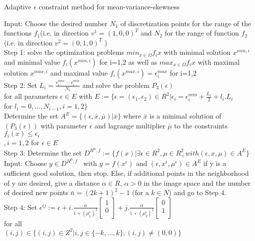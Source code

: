 \documentclass[12pt,a4paper]{article}
\numberwithin{equation}{section}
\begin{document}
\begin{algorithm}[H]
\caption{Adaptive $\epsilon$ constraint method for mean-variance-skewness }
\label{alg:algorithm-label}
Input: Choose the desired number $N_1$ of discretization points
       for the range of the functions $f_1$(i.e. in direction $v^1=(1,0,0)^T$ and $N_2$ for the range of function $f_2$ (i.e. in direction  $v^2=(0,1,0)^T$ )  \\
       Step 1: solve the optimization problems $min_{x \in \Omega} f_{i}x$
       with minimal solution $x^{min,i}$ and minimal value $f_i(x^{min,i})$
       for i=1,2 as well as $max_{x \in \Omega} f_{i}x$ with maximal solution $x^{max,i}$ and maximal value $f_{i}(x^{max,i})=\epsilon_{i}^{max}$ for i=1,2  \\
       Step 2: Set  $L_i=\frac{\epsilon_{i}^{max}-\epsilon_{i}^{min}}{N_i}$
       and solve the problem $P_3(\epsilon)$ \\
       for all parameters $\epsilon \in E$ with 
       $E:=\{ \epsilon=(\epsilon_1,\epsilon_2)\in R^2 | \epsilon_i=\epsilon_{i}^{min}+\frac{L_{i}}{2}+l_i.L_i$  \\
       for $l_i=0,...,N_{i-1} , i=1,2  \}$  \\
       Determine the set 
       $A^{E}=\{ (\epsilon,\bar{x},\bar{\mu}) | \bar{x} \} $ where $\bar{x}$ is a minimal solution of 
       $(P_{3}(\epsilon))$ with parameter $\epsilon$  and lagrange multiplier  $\bar{\mu}$  
        to the constraints $f_i(x) \leq  \epsilon_{i}$ \\
        $,i=1,2$  for $\epsilon \in E   $ \\
        Step 3: Determine the set
        $D^{H^0,f}:=\{f(x)|\exists \epsilon \in R^{2}, \mu \in R^{2}_{+} with (\epsilon,x,\mu)\in A^{E} \} $  \\
        Input: Choose $y\in D^{H^{0},f}$ \ with $y=f(x^{\epsilon})$ and $(\epsilon ,x^{\epsilon},\mu^{\epsilon}) \in A^{E}$
        if y is a sufficient good solution, then stop. Else, if additional points in the neighborhood of y are desired, give a distance $\alpha \in R$, $\alpha>0$ in the image space and the number of desired new points $\bar{n}=(2k+1)^2-1$ (for a $k \in N$) and go to Step 4. \\
        Step 4: Set 
        $\epsilon^{ij}:=\epsilon+i.\frac{\alpha}{1+(\mu_{1}^{\epsilon})^{2}}  \begin{bmatrix}
           1 \\
           0 \\
         \end{bmatrix} + j.\frac{\alpha}{1+(\mu_{2}^{\epsilon})^{2}}  \begin{bmatrix}
           0 \\
           1 \\
         \end{bmatrix} $   \\
         for all  \\
         $(i,j) \in \{ (i,j)\in Z^{2} | i,j \in \{-k,\hdots,k\},(i,j) \neq (0,0)     \} $
                

\end{algorithm}
\end{document}
